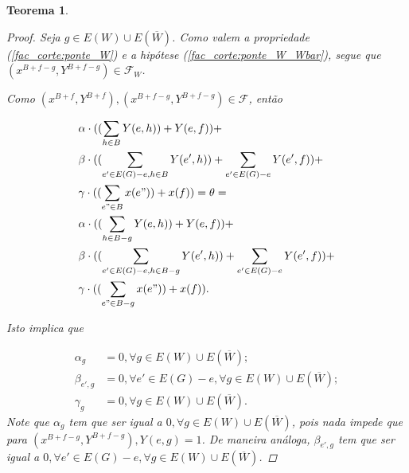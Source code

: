 \documentclass[11pt,reqno]{amsart}
\newtheorem{teorema}{Teorema}
\newcommand{\incid}{\mathcal{X}}
\newcommand{\incidY}{\mathcal{Y}}
\newcommand{\facetF}{\mathcal{F}}
\begin{document}
\begin{teorema}
\begin{proof}
Seja $g \in E(W) \cup E(\overline{W})$. 
Como valem a propriedade (\ref{fac_corte:ponte_W}) e a hipótese 
(\ref{fac_corte:ponte_W_Wbar}), 
segue que $(x^{B+f-g},Y^{B+f-g}) \in \facetF_{W}$. 

Como $(x^{B+f},Y^{B+f}), (x^{B+f-g},Y^{B+f-g}) \in \facetF$, então 

\begin{equation*}
\begin{split}
&\alpha \cdot ((\sum_{h \in B} Y(e,h)) + Y(e,f)) + \\
&\beta \cdot ((\sum_{e' \in E(G) - e, h \in B} Y(e',h)) + \sum_{e' \in E(G) - e}Y(e',f)) + \\
&\gamma \cdot ((\sum_{e" \in B} x(e")) + x(f)) = \theta = \\
&\alpha \cdot ((\sum_{h \in B-g} Y(e,h)) + Y(e,f)) + \\
&\beta \cdot ((\sum_{e' \in E(G) - e, h \in B-g} Y(e',h)) + \sum_{e' \in E(G) - e}Y(e',f)) + \\
&\gamma \cdot ((\sum_{e" \in B-g} x(e")) + x(f)).
\end{split}
\end{equation*}

Isto implica que 

\begin{align}
\alpha_{g} &= 0, \forall g \in E(W) \cup E(\overline{W});\label{coef1}\\
\beta_{e',g} &= 0, \forall e' \in E(G)-e, \forall g \in E(W) \cup E(\overline{W});\label{coef2}\\
\gamma_{g} &= 0, \forall g \in E(W) \cup E(\overline{W})\label{coef3}.
\end{align}
Note que $\alpha_{g}$ tem que ser igual a $0, \forall g \in E(W) \cup E(\overline{W})$, 
pois nada impede que para $(x^{B+f-g},Y^{B+f-g}), Y(e,g) = 1$. De maneira 
análoga, $\beta_{e',g}$ tem que ser igual a 
$0, \forall e' \in E(G) - e, \forall g \in E(W) \cup E(\overline{W})$. 




\end{proof}
\end{teorema}
\end{document}
